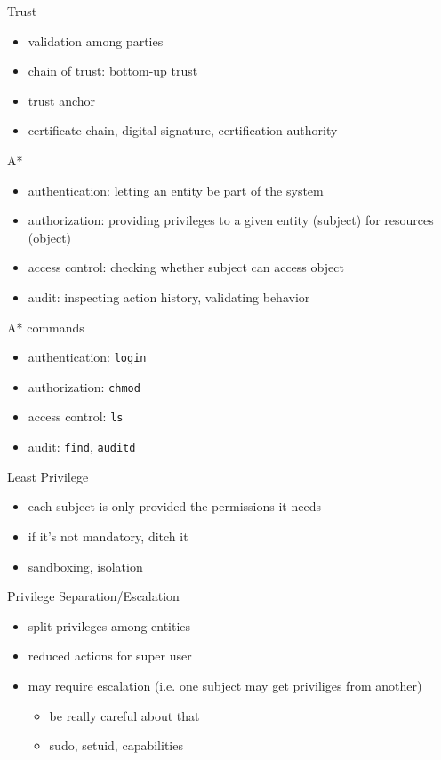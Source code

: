 \documentclass{curs}
\begin{document}
\begin{frame}{Trust}
  \begin{itemize}
    \item validation among parties
    \item chain of trust: bottom-up trust
    \item trust anchor
    \item certificate chain, digital signature, certification authority
  \end{itemize}
\end{frame}

\begin{frame}{A*}
  \begin{itemize}
    \item authentication: letting an entity be part of the system
    \item authorization: providing privileges to a given entity (subject) for resources (object)
    \item access control: checking whether subject can access object
    \item audit: inspecting action history, validating behavior
  \end{itemize}
\end{frame}

\begin{frame}{A* commands}
  \begin{itemize}
    \item authentication: \texttt{login}
    \item authorization: \texttt{chmod}
    \item access control: \texttt{ls}
    \item audit: \texttt{find}, \texttt{auditd}
  \end{itemize}
\end{frame}

\begin{frame}{Least Privilege}
  \begin{itemize}
    \item each subject is only provided the permissions it needs
    \item if it's not mandatory, ditch it
    \item sandboxing, isolation
  \end{itemize}
\end{frame}

\begin{frame}{Privilege Separation/Escalation}
  \begin{itemize}
    \item split privileges among entities
    \item reduced actions for super user
    \item may require escalation (i.e. one subject may get priviliges from another)
      \begin{itemize}
        \item be really careful about that
        \item sudo, setuid, capabilities
      \end{itemize}
  \end{itemize}
\end{frame}
\end{document}
